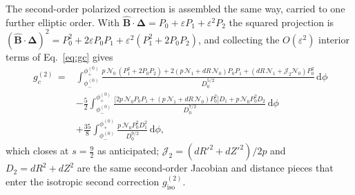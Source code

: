 \documentclass[11pt]{article}
\newcommand{\Del}{\bm{\Delta}}
\newcommand{\Bhat}{\hat{\bm{B}}}
\newcommand{\eps}{\varepsilon}
\newcommand{\dd}{\,\mathrm{d}}
\newcommand{\Order}[1]{O(\eps^{#1})}
\begin{document}
The second-order polarized correction is assembled the same way, carried to one further elliptic order. With $\Bhat\cdot\Del=P_0+\eps P_1+\eps^2 P_2$ the squared projection is $(\Bhat\cdot\Del)^2=P_0^2+2\eps P_0P_1+\eps^2(P_1^2+2P_0P_2)$, and collecting the $\Order2$ interior terms of Eq.~\eqref{eq:gc} gives
\begin{align}
\boxed{\,g_c^{(2)}\,}=&\int_{\phi_-^{(0)}}^{\phi_+^{(0)}}\frac{p\,\mathcal{N}_0\,(P_1^2+2P_0P_2)+2(p\,\mathcal{N}_1+dR\,\mathcal{N}_0)P_0P_1+(dR\,\mathcal{N}_1+\mathcal{J}_2\mathcal{N}_0)P_0^2}{D_0^{5/2}}\dd\phi \nonumber\\
&-\frac52\int_{\phi_-^{(0)}}^{\phi_+^{(0)}}\frac{\big[2p\,\mathcal{N}_0P_0P_1+(p\,\mathcal{N}_1+dR\,\mathcal{N}_0)P_0^2\big]D_1+p\,\mathcal{N}_0P_0^2D_2}{D_0^{7/2}}\dd\phi \nonumber\\
&+\frac{35}{8}\int_{\phi_-^{(0)}}^{\phi_+^{(0)}}\frac{p\,\mathcal{N}_0P_0^2D_1^2}{D_0^{9/2}}\dd\phi,
\label{eq:gc2}
\end{align}
which closes at $s=\tfrac92$ as anticipated; $\mathcal{J}_2=(dR'^2+dZ'^2)/2p$ and $D_2=dR^2+dZ^2$ are the same second-order Jacobian and distance pieces that enter the isotropic second correction $g_{\mathrm{iso}}^{(2)}$.
\end{document}

